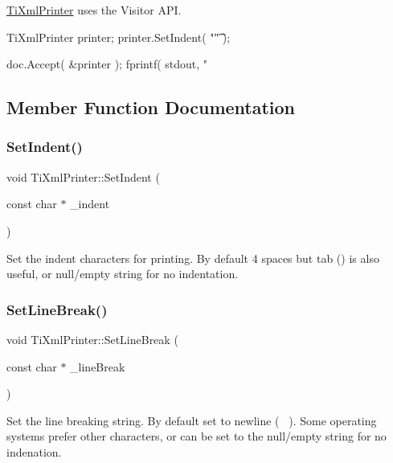 \hyperlink{classTiXmlPrinter}{Ti\+Xml\+Printer} uses the Visitor A\+PI. \begin{DoxyVerb}TiXmlPrinter printer;
printer.SetIndent( "\t" );

doc.Accept( &printer );
fprintf( stdout, "%
\end{DoxyVerb}
 

\subsection{Member Function Documentation}
\mbox{\label{classTiXmlPrinter_a213377a4070c7e625bae59716b089e5e}} 
\subsubsection{\texorpdfstring{Set\+Indent()}{SetIndent()}}
{\footnotesize\ttfamily void Ti\+Xml\+Printer\+::\+Set\+Indent (\begin{DoxyParamCaption}\item[{const char $\ast$}]{\+\_\+indent }\end{DoxyParamCaption})\hspace{0.3cm}{\ttfamily [inline]}}

Set the indent characters for printing. By default 4 spaces but tab () is also useful, or null/empty string for no indentation. \mbox{\label{classTiXmlPrinter_a4be1e37e69e3858c59635aa947174fe6}} 
\subsubsection{\texorpdfstring{Set\+Line\+Break()}{SetLineBreak()}}
{\footnotesize\ttfamily void Ti\+Xml\+Printer\+::\+Set\+Line\+Break (\begin{DoxyParamCaption}\item[{const char $\ast$}]{\+\_\+line\+Break }\end{DoxyParamCaption})\hspace{0.3cm}{\ttfamily [inline]}}

Set the line breaking string. By default set to newline (~\newline
). Some operating systems prefer other characters, or can be set to the null/empty string for no indenation. \mbox{\label{classTiXmlPrinter_ab23a90629e374cb1cadca090468bbd19}} 
